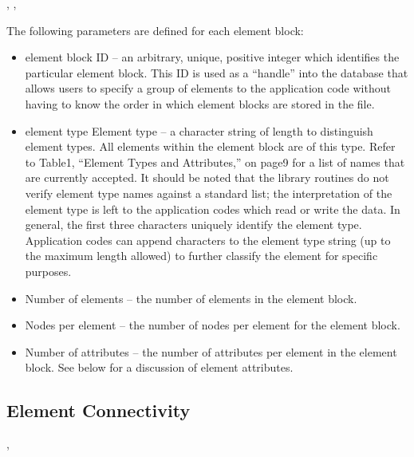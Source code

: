 \begin{spacing}{1.5}
\api {}, , 
\end{spacing}

The following parameters are defined for each element block:

\begin{itemize}
 \item element block ID -- an arbitrary, unique, positive integer
 which identifies the particular element block. This ID is used as a
 ``handle'' into the database that allows users to specify a group of
 elements to the application code without having to know the order in
 which element blocks are stored in the file.

 \item element type Element type -- a character string of length
  to distinguish element types. All elements
 within the element block are of this type. Refer to
 Table{\nobreakspace}1, ``Element Types and Attributes,'' on
 page{\nobreakspace}9 for a list of names that are currently
 accepted. It should be noted that the \exo{} library routines do not
 verify element type names against a standard list; the interpretation
 of the element type is left to the application codes which read or
 write the data. In general, the first three characters uniquely
 identify the element type. Application codes can append characters to
 the element type string (up to the maximum length allowed) to further
 classify the element for specific purposes.

 \item {Number of elements -- the number of elements in the 
element block.}

 \item {Nodes per element -- the number of nodes per element 
for the element block.}

 \item {Number of attributes -- the number of attributes per element
 in the element block. See below for a discussion of element
 attributes.}
\end{itemize}



\subsection{Element Connectivity}

\begin{spacing}{1.5}
\api {}, 
\end{spacing}

